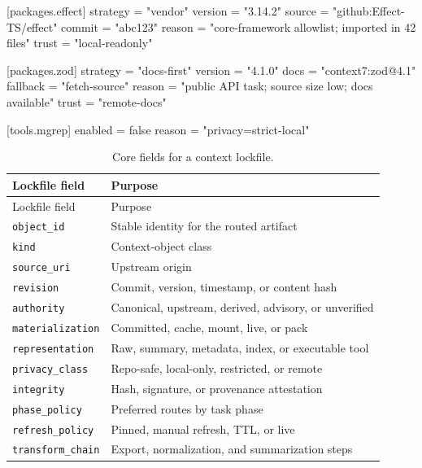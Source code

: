 \documentclass[
  11pt,
  letterpaper,
  numbers=noendperiod,
  parskip=half]{scrartcl}
\newenvironment{Shaded}{}{}
\newcommand{\ConstantTok}[1]{\textcolor[rgb]{0.00,0.36,0.77}{#1}}
\newcommand{\DataTypeTok}[1]{\textcolor[rgb]{0.84,0.23,0.29}{#1}}
\newcommand{\KeywordTok}[1]{\textcolor[rgb]{0.84,0.23,0.29}{#1}}
\newcommand{\OperatorTok}[1]{\textcolor[rgb]{0.14,0.16,0.18}{#1}}
\newcommand{\StringTok}[1]{\textcolor[rgb]{0.01,0.18,0.38}{#1}}
\begin{document}
\begin{Shaded}
\begin{Highlighting}[]
\KeywordTok{[packages.effect]}
\DataTypeTok{strategy} \OperatorTok{=} \StringTok{"vendor"}
\DataTypeTok{version} \OperatorTok{=} \StringTok{"3.14.2"}
\DataTypeTok{source} \OperatorTok{=} \StringTok{"github:Effect{-}TS/effect"}
\DataTypeTok{commit} \OperatorTok{=} \StringTok{"abc123"}
\DataTypeTok{reason} \OperatorTok{=} \StringTok{"core{-}framework allowlist; imported in 42 files"}
\DataTypeTok{trust} \OperatorTok{=} \StringTok{"local{-}readonly"}

\KeywordTok{[packages.zod]}
\DataTypeTok{strategy} \OperatorTok{=} \StringTok{"docs{-}first"}
\DataTypeTok{version} \OperatorTok{=} \StringTok{"4.1.0"}
\DataTypeTok{docs} \OperatorTok{=} \StringTok{"context7:zod@4.1"}
\DataTypeTok{fallback} \OperatorTok{=} \StringTok{"fetch{-}source"}
\DataTypeTok{reason} \OperatorTok{=} \StringTok{"public API task; source size low; docs available"}
\DataTypeTok{trust} \OperatorTok{=} \StringTok{"remote{-}docs"}

\KeywordTok{[tools.mgrep]}
\DataTypeTok{enabled} \OperatorTok{=} \ConstantTok{false}
\DataTypeTok{reason} \OperatorTok{=} \StringTok{"privacy=strict{-}local"}
\end{Highlighting}
\end{Shaded}

\begin{longtable}[]{@{}ll@{}}
\caption{Core fields for a context
lockfile.}\label{tbl-lockfields}\tabularnewline
\toprule\noalign{}
Lockfile field & Purpose \\
\midrule\noalign{}
\endfirsthead
\toprule\noalign{}
Lockfile field & Purpose \\
\midrule\noalign{}
\endhead
\bottomrule\noalign{}
\endlastfoot
\texttt{object\_id} & Stable identity for the routed artifact \\
\texttt{kind} & Context-object class \\
\texttt{source\_uri} & Upstream origin \\
\texttt{revision} & Commit, version, timestamp, or content hash \\
\texttt{authority} & Canonical, upstream, derived, advisory, or
unverified \\
\texttt{materialization} & Committed, cache, mount, live, or pack \\
\texttt{representation} & Raw, summary, metadata, index, or executable
tool \\
\texttt{privacy\_class} & Repo-safe, local-only, restricted, or
remote \\
\texttt{integrity} & Hash, signature, or provenance attestation \\
\texttt{phase\_policy} & Preferred routes by task phase \\
\texttt{refresh\_policy} & Pinned, manual refresh, TTL, or live \\
\texttt{transform\_chain} & Export, normalization, and summarization
steps \\
\end{longtable}
\end{document}
